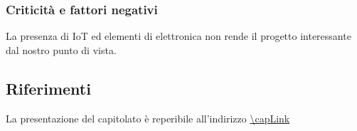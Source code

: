 \subsubsection{Criticità e fattori negativi}
La presenza di IoT ed elementi di elettronica non rende il progetto interessante dal nostro punto di vista.

\subsection{Riferimenti}
La presentazione del capitolato è reperibile all'indirizzo \url{\capLink}